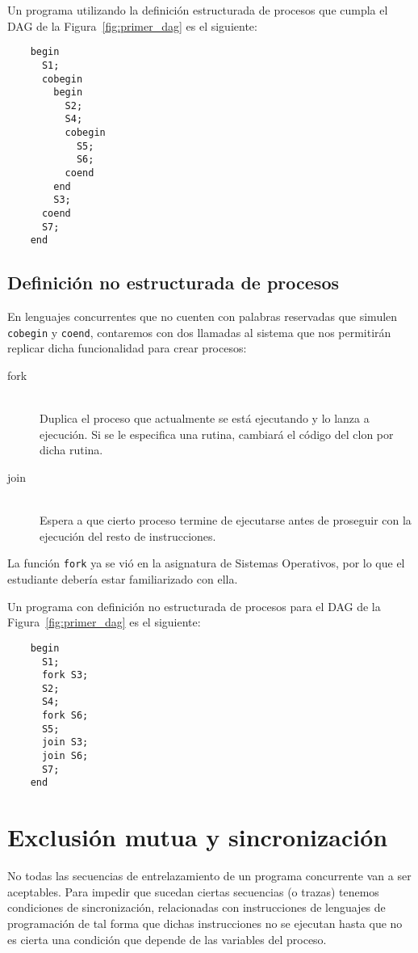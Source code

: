 \begin{ejemplo}
    Un programa utilizando la definición estructurada de procesos que cumpla el DAG de la Figura~\ref{fig:primer_dag} es el siguiente:
    \begin{verbatim}
    begin
      S1;
      cobegin
        begin
          S2;
          S4;
          cobegin
            S5;
            S6;
          coend
        end
        S3;
      coend
      S7;
    end
    \end{verbatim}
\end{ejemplo}

\subsection{Definición no estructurada de procesos}
En lenguajes concurrentes que no cuenten con palabras reservadas que simulen \verb|cobegin| y \verb|coend|, contaremos con dos llamadas al sistema que nos permitirán replicar dicha funcionalidad para crear procesos:
\begin{description}
    \item [fork]~\\
        Duplica el proceso que actualmente se está ejecutando y lo lanza a ejecución. Si se le especifica una rutina, cambiará el código del clon por dicha rutina.
    \item [join]~\\
        Espera a que cierto proceso termine de ejecutarse antes de proseguir con la ejecución del resto de instrucciones.
\end{description}
La función \verb|fork| ya se vió en la asignatura de Sistemas Operativos, por lo que el estudiante debería estar familiarizado con ella.

\begin{ejemplo}
    Un programa con definición no estructurada de procesos para el DAG de la Figura~\ref{fig:primer_dag} es el siguiente:
    \begin{verbatim}
    begin        
      S1;
      fork S3;
      S2;
      S4;
      fork S6;
      S5;
      join S3;
      join S6;
      S7;
    end
    \end{verbatim}
\end{ejemplo}

\section{Exclusión mutua y sincronización}
No todas las secuencias de entrelazamiento de un programa concurrente van a ser aceptables. Para impedir que sucedan ciertas secuencias (o trazas) tenemos condiciones de sincronización, relacionadas con instrucciones de lenguajes de programación de tal forma que dichas instrucciones no se ejecutan hasta que no es cierta una condición que depende de las variables del proceso.

